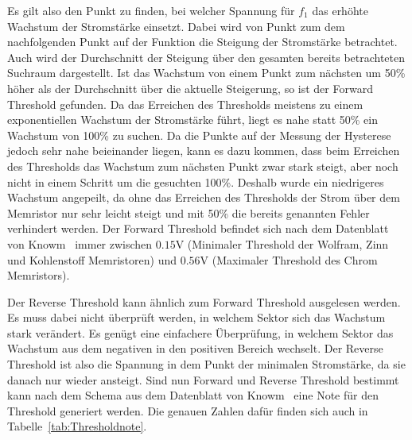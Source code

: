 Es gilt also den Punkt zu finden, bei welcher Spannung für $f_1$ das erhöhte Wachstum der Stromstärke einsetzt. Dabei wird von Punkt zum dem nachfolgenden Punkt auf der Funktion die Steigung der Stromstärke betrachtet. Auch wird der Durchschnitt der Steigung über den gesamten bereits betrachteten Suchraum dargestellt. Ist das Wachstum von einem Punkt zum nächsten um 50\% höher als der Durchschnitt über die aktuelle Steigerung, so ist der Forward Threshold gefunden. Da das Erreichen des Thresholds meistens zu einem exponentiellen Wachstum der Stromstärke führt, liegt es nahe statt 50\% ein Wachstum von 100\% zu suchen. Da die Punkte auf der Messung der Hysterese jedoch sehr nahe beieinander liegen, kann es dazu kommen, dass beim Erreichen des Thresholds das Wachstum zum nächsten Punkt zwar stark steigt, aber noch nicht in einem Schritt um die gesuchten 100\%. Deshalb wurde ein niedrigeres Wachstum angepeilt, da ohne das Erreichen des Thresholds der Strom über dem Memristor nur sehr leicht steigt und mit 50\% die bereits genannten Fehler verhindert werden. Der Forward Threshold befindet sich nach dem Datenblatt von Knowm~\cite{knowm_comp_2019} immer zwischen $0.15$V (Minimaler Threshold der Wolfram, Zinn und Kohlenstoff Memristoren) und $0.56$V (Maximaler Threshold des Chrom Memristors).


Der Reverse Threshold kann ähnlich zum Forward Threshold ausgelesen werden. Es muss dabei nicht überprüft werden, in welchem Sektor sich das Wachstum stark verändert. Es genügt eine einfachere Überprüfung, in welchem Sektor das Wachstum aus dem negativen in den positiven Bereich wechselt. Der Reverse Threshold ist also die Spannung in dem Punkt der minimalen Stromstärke, da sie danach nur wieder ansteigt. Sind nun Forward und Reverse Threshold bestimmt kann nach dem Schema aus dem Datenblatt von Knowm~\cite{knowm_comp_2019} eine Note für den Threshold generiert werden. Die genauen Zahlen dafür finden sich auch in Tabelle~\ref{tab:Thresholdnote}.

